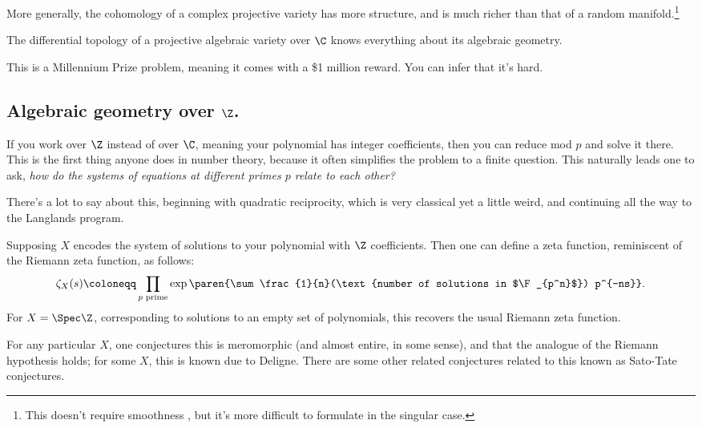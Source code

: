 More generally, the cohomology of a complex projective variety has more structure, and is much richer than that of
a random manifold.\footnote{This doesn't require smoothness , but it's more difficult to formulate in
the singular case.}
\begin{conj}
The differential topology of a projective algebraic variety over $\C$ knows everything about its algebraic
geometry.
\end{conj}
This is a Millennium Prize problem, meaning it comes with a \$1 million reward. You can infer that it's hard.
\subsection*{Algebraic geometry over $\Z$.}
If you work over $\Z$ instead of over $\C$, meaning your polynomial has integer coefficients, then you can reduce
mod $p$ and solve it there. This is the first thing anyone does in number theory, because it often simplifies the
problem to a finite question. This naturally leads one to ask, \emph{how do the systems of equations at different
primes $p$ relate to each other?}

There's a lot to say about this, beginning with quadratic reciprocity, which is very classical yet a little weird,
and continuing all the way to the Langlands program.

Supposing $X$ encodes the system of solutions to your polynomial with $\Z$ coefficients. Then one can define a zeta
function, reminiscent of the Riemann zeta function, as follows:
\begin{equation}
	\zeta_X(s)\coloneqq \prod_{\text{$p$ prime}}\exp\paren{\sum \frac{1}{n}(\text{number of solutions in
	$\F_{p^n}$}) p^{-ns}}.
\end{equation}
For $X = \Spec\Z$, corresponding to solutions to an empty set of polynomials, this recovers the usual Riemann zeta
function.

For any particular $X$, one conjectures this is meromorphic (and almost entire, in some sense), and that the
analogue of the Riemann hypothesis holds; for some $X$, this is known due to Deligne. There are some other related
conjectures related to this known as Sato-Tate conjectures.
